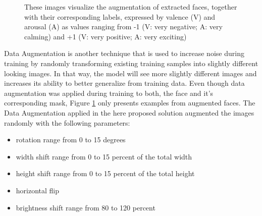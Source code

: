 \begin{figure}[htpb]
  \hfill
  \caption[Data Augmentation]{These images visualize the augmentation of extracted faces, together with their corresponding labels, expressed by valence (V) and arousal (A) as values ranging from -1 (V: very negative; A: very calming) and +1 (V: very positive; A: very exciting)}
  \label{fig:MethodologyDataAugmentation}
\end{figure}

\noindent Data Augmentation is another technique that is used to increase noise during training by randomly transforming existing training samples into slightly different looking images. In that way, the model will see more slightly different images and increases its ability to better generalize from training data. Even though data augmentation was applied during training to both, the face and it's corresponding mask, Figure \ref{fig:MethodologyDataAugmentation} only presents examples from augmented faces.
\newline\newline
The Data Augmentation applied in the here proposed solution augmented the images randomly with the following parameters:

\begin{itemize}
    \item rotation range from 0 to 15 degrees
    \item width shift range from 0 to 15 percent of the total width
    \item height shift range from 0 to 15 percent of the total height
    \item horizontal flip
    \item brightness shift range from 80 to 120 percent
\end{itemize}

